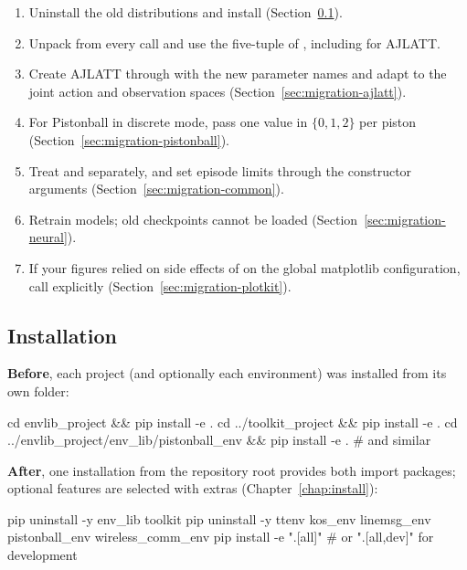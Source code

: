 \begin{enumerate}
  \item Uninstall the old distributions and install 
    (Section~\ref{sec:migration-install}).
  \item Unpack  from every  call and use
    the five-tuple of , including for AJLATT.
  \item Create AJLATT through  with the new parameter
    names and adapt to the joint action and observation spaces
    (Section~\ref{sec:migration-ajlatt}).
  \item For Pistonball in discrete mode, pass one value in $\{0, 1, 2\}$ per
    piston (Section~\ref{sec:migration-pistonball}).
  \item Treat  and  separately, and set episode
    limits through the constructor arguments
    (Section~\ref{sec:migration-common}).
  \item Retrain  models; old checkpoints cannot be loaded
    (Section~\ref{sec:migration-neural}).
  \item If your figures relied on side effects of  on the global
    matplotlib configuration, call  explicitly
    (Section~\ref{sec:migration-plotkit}).
\end{enumerate}

\subsection{Installation}\label{sec:migration-install}

\textbf{Before}, each project (and optionally each environment) was installed
from its own folder:

\begin{shellcode}
cd envlib_project && pip install -e .
cd ../toolkit_project && pip install -e .
cd ../envlib_project/env_lib/pistonball_env && pip install -e .   # and similar
\end{shellcode}

\textbf{After}, one installation from the repository root provides both
import packages; optional features are selected with extras
(Chapter~\ref{chap:install}):

\begin{shellcode}
pip uninstall -y env_lib toolkit
pip uninstall -y ttenv kos_env linemsg_env pistonball_env wireless_comm_env
pip install -e ".[all]"            # or ".[all,dev]" for development
\end{shellcode}

